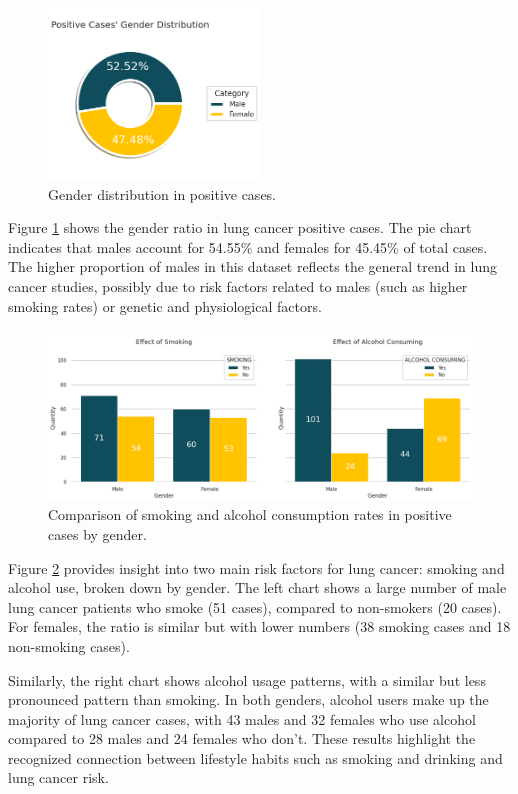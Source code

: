 \begin{figure}[H]
    \centering
    \includegraphics[width=0.5\textwidth]{Images/gender.png}
    \caption{Gender distribution in positive cases.}
    \label{fig:gender_dist}
\end{figure}

Figure \ref{fig:gender_dist} shows the gender ratio in lung cancer positive cases. The pie chart indicates that males account for 54.55\% and females for 45.45\% of total cases. The higher proportion of males in this dataset reflects the general trend in lung cancer studies, possibly due to risk factors related to males (such as higher smoking rates) or genetic and physiological factors.

\begin{figure}[H]
    \centering
    \includegraphics[width=\textwidth]{Images/smoke_alcohol.png}
    \caption{Comparison of smoking and alcohol consumption rates in positive cases by gender.}
    \label{fig:smoke_alcohol}
\end{figure}

Figure \ref{fig:smoke_alcohol} provides insight into two main risk factors for lung cancer: smoking and alcohol use, broken down by gender. The left chart shows a large number of male lung cancer patients who smoke (51 cases), compared to non-smokers (20 cases). For females, the ratio is similar but with lower numbers (38 smoking cases and 18 non-smoking cases).

Similarly, the right chart shows alcohol usage patterns, with a similar but less pronounced pattern than smoking. In both genders, alcohol users make up the majority of lung cancer cases, with 43 males and 32 females who use alcohol compared to 28 males and 24 females who don't. These results highlight the recognized connection between lifestyle habits such as smoking and drinking and lung cancer risk.

